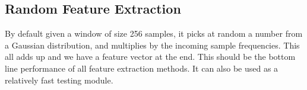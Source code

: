 \subsection{Random Feature Extraction}

By default given a window of size 256 samples, it picks
at random a number from a Gaussian distribution, and
multiplies by the incoming sample frequencies.
This all adds up and we have a feature vector at the end.
This should be the bottom line performance of all feature
extraction methods. It can also be used as a relatively fast
testing module.
